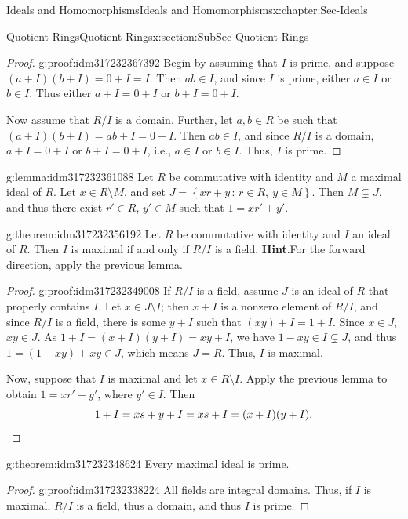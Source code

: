 \documentclass[oneside,10pt,]{book}
\newcommand{\blocktitlefont}{\relax}
\newcommand{\qedhere}{\relax}
\numberwithin{equation}{section}
\newcommand{\setof}[2]{{\left\{#1\,\colon\,#2\right\}}}
\begin{document}
\begin{chapterptx}{Ideals and Homomorphisms}{}{Ideals and Homomorphisms}{}{}{x:chapter:Sec-Ideals}
\begin{sectionptx}{Quotient Rings}{}{Quotient Rings}{}{}{x:section:SubSec-Quotient-Rings}
\begin{proof}{}{g:proof:idm317232367392}
Begin by assuming that \(I\) is prime, and suppose \((a+I)(b+I) = 0+I = I\). Then \(ab \in I\), and since \(I\) is prime, either \(a\in I\) or \(b\in I\). Thus either \(a+I = 0+I\) or \(b+I = 0+I\).%
\par
Now assume that \(R/I\) is a domain. Further, let \(a,b\in R\) be such that \((a+I)(b+I) = ab+I = 0+I\). Then \(ab\in I\), and since \(R/I\) is a domain, \(a+I = 0+I\) or \(b+I = 0+I\), i.e., \(a\in I\) or \(b\in I\). Thus, \(I\) is prime.%
\end{proof}
\begin{lemma}{}{}{g:lemma:idm317232361088}%
Let \(R\) be commutative with identity and \(M\) a maximal ideal of \(R\). Let \(x\in R\setminus M\), and set \(J = \setof{xr+y}{r\in R, \ y\in M}\). Then \(M\subsetneq J\), and thus there exist \(r'\in R\), \(y'\in M\) such that \(1 = xr'+y'\).%
\end{lemma}
\begin{theorem}{}{}{g:theorem:idm317232356192}%
Let \(R\) be commutative with identity and \(I\) an ideal of \(R\). Then \(I\) is maximal if and only if \(R/I\) is a field.%
\textbf{\blocktitlefont Hint}.\quad{}For the forward direction, apply the previous lemma.%
\end{theorem}
\begin{proof}{}{g:proof:idm317232349008}
If \(R/I\) is a field, assume \(J\) is an ideal of \(R\) that properly contains \(I\). Let \(x\in J\setminus I\); then \(x+I\) is a nonzero element of \(R/I\), and since \(R/I\) is a field, there is some \(y+I\) such that \((xy)+I = 1+I\). Since \(x\in J\), \(xy\in J\). As \(1+I = (x+I)(y+I) = xy+I\), we have \(1-xy\in I\subsetneq J\), and thus \(1 = (1-xy)+xy \in J\), which means \(J = R\). Thus, \(I\) is maximal.%
\par
Now, suppose that \(I\) is maximal and let \(x\in R\setminus I\). Apply the previous lemma to obtain \(1 = xr' + y'\), where \(y'\in I\). Then%
\begin{equation*}
1 + I = xs+y + I = xs + I = (x+I)(y+I)\text{.}\qedhere
\end{equation*}
%
\end{proof}
\begin{theorem}{}{}{g:theorem:idm317232348624}%
Every maximal ideal is prime.%
\end{theorem}
\begin{proof}{}{g:proof:idm317232338224}
All fields are integral domains. Thus, if \(I\) is maximal, \(R/I\) is a field, thus a domain, and thus \(I\) is prime.%
\end{proof}

\end{sectionptx}
\end{chapterptx}
\end{document}
